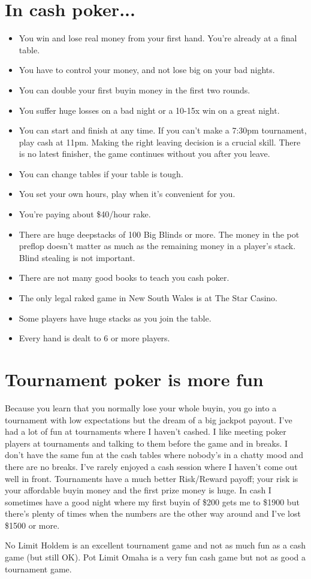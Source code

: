 \section{In cash poker...}

\begin{itemize}
  \item You win and lose real money from your first hand. You're already
    at a final table.
  \item You have to control your money, and not lose big on your bad nights.
  \item You can double your first buyin money in the first two rounds.
  \item You suffer huge losses on a bad night or a 10-15x win on a great night.
  \item You can start and finish at any time. If you can't make a
    7:30pm tournament, play cash at 11pm. Making the right leaving
    decision is a crucial skill. There is no latest finisher, the game
    continues without you after you leave.
  \item You can change tables if your table is tough.
  \item You set your own hours, play when it's convenient for you.
  \item You're paying about \$40/hour rake.
  \item There are huge deepstacks of 100 Big Blinds or more. The money
    in the pot preflop doesn't matter as much as the remaining money
    in a player's stack. Blind stealing is not important.
  \item There are not many good books to teach you cash poker.
  \item The only legal raked game in New South Wales is at The Star Casino.
  \item Some players have huge stacks as you join the table.
  \item Every hand is dealt to 6 or more players.
\end{itemize}

\section{Tournament poker is more fun}

Because you learn that you normally lose your whole
buyin, you go into a tournament with low expectations but the dream of
a big jackpot payout. I've had a lot of fun at tournaments where I haven't
cashed. I like meeting poker players at tournaments and talking
to them before the game and in breaks. I don't have the same fun
at the cash tables where nobody's in a chatty mood and there are
no breaks. I've rarely enjoyed a cash session where I haven't come out
well in front. Tournaments have a much better Risk/Reward payoff; your
risk is your affordable buyin money and the first prize money is
huge. In cash I sometimes have a good night where my first buyin
of \$200 gets me to \$1900 but there's plenty of times when the
numbers are the other way around and I've lost \$1500 or more.

No Limit Holdem is an excellent tournament game and not as much fun as
a cash game (but still OK). Pot Limit Omaha is a very fun cash game
but not as good a tournament game.
